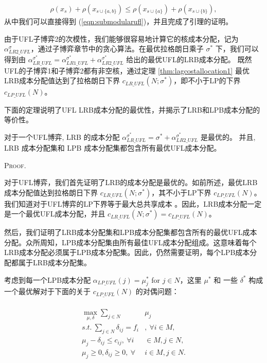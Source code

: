 \documentclass[UTF8]{article}
\begin{document}
\begin{定义}
      \begin{eqnarray*}
        \rho(x_s) + \rho(x_{s\cup \{a,b\}}) \leq \rho(x_{s\cup\{a\}}) + \rho(x_{s\cup \{b\}}),
      \end{eqnarray*}
      从中我们可以直接得到 (\ref{eqn:submodularufl})，并且完成了引理的证明。
      \hfill\Halmos

      由于UFL子博弈2的次模性，我们能够很容易地计算它的核成本分配，记为 $\alpha_{LR2\_UFL}^{\sigma}$，通过子博弈章节中的贪心算法。在最优拉格朗日乘子 $\sigma^*$ 下，我们可以得到由 $\alpha_{LR\_UFL}^{\sigma^*} = \alpha_{LR1\_UFL}^{\sigma^*} + \alpha_{LR2\_UFL}^{\sigma^*}$ 给出的最优UFL的LRB成本分配。
      既然UFL的子博弈1和子博弈2都有非空核，通过定理 \ref{thm:lagcostallocation1} 最优LRB成本分配值达到了拉格朗日下界 $c_{LR\_UFL}(N;\sigma^*)$，即不小于LP的下界 $c_{LP\_UFL}(N)$。

      下面的定理说明了UFL LRB成本分配的最优性，并揭示了LRB和LPB成本分配的等价性。

      \begin{theorem}\label{lemma:lpbequallrbufl}
      对于一个UFL博弈, LRB 的成本分配 $\alpha_{LR\_UFL}^{\sigma^*} = \sigma^* + \alpha_{LR2\_UFL}^{\sigma^*}$ 是最优的。 并且, LRB 成本分配集和 LPB 成本分配集都包含所有最优UFL成本分配。
      \end{theorem}
      {\scshape Proof.}

      对于UFL博弈，我们首先证明了LRB的成本分配是最优的。如前所述，最优LRB成本分配值达到拉格朗日下界 $c_{LR\_UFL}(N;\sigma^*)$，其不小于LP下界 $c_{LP\_UFL}(N)$。
      我们知道对于UFL博弈的LP下界等于最大总共享成本 \citep{Kolen1983FacilityLocationGame,Goemans2000FacilityLocationGames}。因此，LRB成本分配一定是一个最优UFL成本分配，并且 $c_{LR\_UFL}(N;\sigma^*)=c_{LP\_UFL}(N)$。

      然后，我们证明了LRB成本分配集和LPB成本分配集都包含所有的最优UFL成本分配。众所周知，LPB成本分配集由所有最佳UFL成本分配\citep{Goemans2000FacilityLocationGames}组成。这意味着每个LRB成本分配必须属于LPB成本分配集。因此，仍然需要证明，每个LPB成本分配都属于LRB成本分配集。

      考虑到每一个LPB成本分配 $\alpha_{LP\_UFL}(j)=\mu^*_j$ for $j \in N$，这里 $\mu^*$ 和 一些 $\delta^*$ 构成一个最优解对于下面的关于 $c_{LP\_UFL}(N)$ 的对偶问题：

      \begin{eqnarray*}
      \begin{aligned}
      \begin{split}\label{eqn:UFLLRdual1}
       \max_{\mu,\delta} \sum_{j \in N}&\mu_j\\
      s.t.~\sum_{j \in N}\delta_{ij} = f_i&, ~\forall i \in M,\\
      \mu_j - \delta_{ij} \leq c_{ij}, ~\forall i& \in M, j \in N,\\
       \mu_j \geq 0, \delta_{ij} \geq 0,~\forall &i \in M, j \in N.
      \end{split}
      \end{aligned}
      \end{eqnarray*}


\end{定义}
\end{document}
